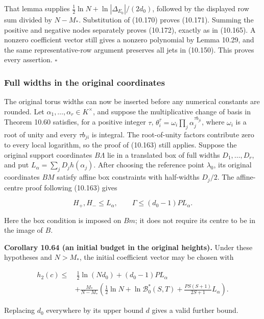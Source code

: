 \documentclass[
  11pt,
  a4paper,
]{article}
\begin{document}
That lemma supplies \(\frac12\ln N+\ln|\Delta_{E_0}|/(2d_0)\), followed
by the displayed row sum divided by \(N-M_*\). Substitution of (10.170)
proves (10.171). Summing the positive and negative nodes separately
proves (10.172), exactly as in (10.165). A nonzero coefficient vector
still gives a nonzero polynomial by Lemma 10.29, and the same
representative-row argument preserves all jets in (10.150). This proves
every assertion. \(\square\)

\subsubsection{Full widths in the original
coordinates}\label{full-widths-in-the-original-coordinates}

The original torus widths can now be inserted before any numerical
constants are rounded. Let \(\alpha_1,\ldots,\alpha_r\in K^\times\), and
suppose the multiplicative change of basis in Theorem 10.60 satisfies,
for a positive integer \(\tau\),
\(\theta_i^\tau=\omega_i\prod_j\alpha_j^{\tau b_{ji}}\), where
\(\omega_i\) is a root of unity and every \(\tau b_{ji}\) is integral.
The root-of-unity factors contribute zero to every local logarithm, so
the proof of (10.163) still applies. Suppose the original support
coordinates \(B\Lambda\) lie in a translated box of full widths
\(D_1,\ldots,D_r\), and put \(L_\alpha=\sum_j D_j h(\alpha_j)\). After
choosing the reference point \(\lambda_0\), its original coordinates
\(BM\) satisfy affine box constraints with half-widths \(D_j/2\). The
affine-centre proof following (10.163) gives

\[
H_+,H_-\le L_\alpha,\qquad
\Gamma\le(d_0-1)P L_\alpha.
\tag{10.173}
\]

Here the box condition is imposed on \(Bm\); it does not require its
centre to be in the image of \(B\).

\textbf{Corollary 10.64 (an initial budget in the original heights).}
Under these hypotheses and \(N>M_*\), the initial coefficient vector may
be chosen with

\[
\begin{aligned}
h_2(c)\le&\ \frac12\ln(Nd_0)+(d_0-1)P L_\alpha\\
&+\frac{M_*}{N-M_*}
\left(\frac12\ln N+\ln\mathcal B_0^*(S,T)
+\frac{PS(S+1)}{2S+1}L_\alpha\right).
\end{aligned}
\tag{10.174}
\]

Replacing \(d_0\) everywhere by its upper bound \(d\) gives a valid
further bound.
\end{document}
